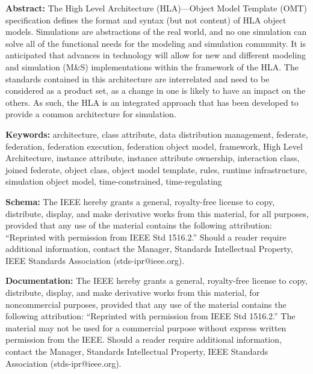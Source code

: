 \thispagestyle{empty}
\vspace*{25pt}
{\fmsans\fontsize{10}{12}\selectfont
\textbf{Abstract:} The High Level Architecture (HLA)---Object Model Template (OMT) specification defines
the format and syntax (but not content) of HLA object models. Simulations are abstractions of the real
world, and no one simulation can solve all of the functional needs for the modeling and simulation
community. It is anticipated that advances in technology will allow for new and different modeling and
simulation (M\&S) implementations within the framework of the HLA. The standards contained in this
architecture are interrelated and need to be considered as a product set, as a change in one is likely to have
an impact on the others. As such, the HLA is an integrated approach that has been developed to provide a
common architecture for simulation.\par
\vspace{0pt}
\textbf{Keywords:} architecture, class attribute, data distribution management, federate, federation,
    federation execution, federation object model, framework, High Level Architecture, instance attribute,
    instance attribute ownership, interaction class, joined federate, object class, object model template, rules,
    runtime infrastructure, simulation object model, time-constrained, time-regulating\par

\vspace{70pt}
\textbf{Schema:} The IEEE hereby grants a general, royalty-free license to copy, distribute, display, and make
derivative works from this material, for all purposes, provided that any use of the material contains the
following attribution: ``Reprinted with permission from IEEE Std 1516.2.''
Should a reader require additional information, contact the Manager, Standards Intellectual Property,
    IEEE Standards Association (stds-ipr@ieee.org).\par

\vspace{16pt}
\textbf{Documentation:} The IEEE hereby grants a general, royalty-free license to copy, distribute,
    display, and make derivative works from this material, for noncommercial purposes, provided that any use
of the material contains the following attribution: ``Reprinted with permission from IEEE Std
1516.2.'' The material may not be used for a commercial purpose without express written
permission from the IEEE. Should a reader require additional information, contact the Manager, Standards
Intellectual Property, IEEE Standards Association (stds-ipr@ieee.org).\par
}

